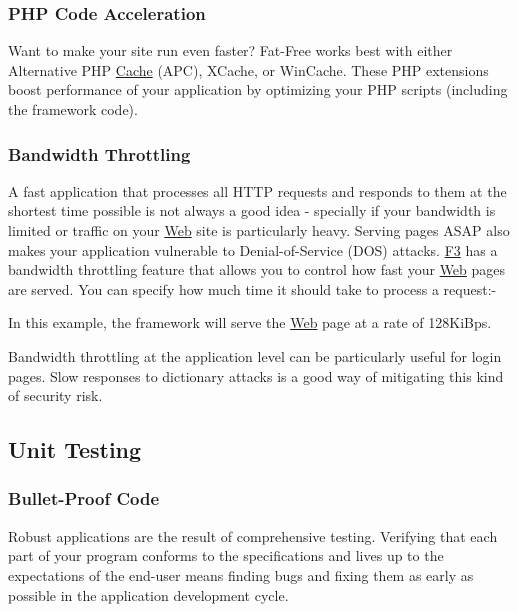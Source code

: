 \subsubsection*{P\+HP Code Acceleration}

Want to make your site run even faster? Fat-\/\+Free works best with either Alternative P\+HP \hyperlink{class_cache}{Cache} (A\+PC), X\+Cache, or Win\+Cache. These P\+HP extensions boost performance of your application by optimizing your P\+HP scripts (including the framework code).

\subsubsection*{Bandwidth Throttling}

A fast application that processes all H\+T\+TP requests and responds to them at the shortest time possible is not always a good idea -\/ specially if your bandwidth is limited or traffic on your \hyperlink{class_web}{Web} site is particularly heavy. Serving pages A\+S\+AP also makes your application vulnerable to Denial-\/of-\/\+Service (D\+OS) attacks. \hyperlink{class_f3}{F3} has a bandwidth throttling feature that allows you to control how fast your \hyperlink{class_web}{Web} pages are served. You can specify how much time it should take to process a request\+:-\/




In this example, the framework will serve the \hyperlink{class_web}{Web} page at a rate of 128\+Ki\+Bps.

Bandwidth throttling at the application level can be particularly useful for login pages. Slow responses to dictionary attacks is a good way of mitigating this kind of security risk.

\subsection*{Unit Testing}

\subsubsection*{Bullet-\/\+Proof Code}

Robust applications are the result of comprehensive testing. Verifying that each part of your program conforms to the specifications and lives up to the expectations of the end-\/user means finding bugs and fixing them as early as possible in the application development cycle.

